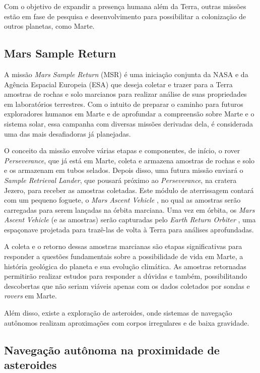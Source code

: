 Com o objetivo de expandir a presença humana além da Terra, outras missões estão em fase de pesquisa e desenvolvimento para possibilitar a colonização de outros planetas, como Marte.

\subsection{Mars Sample Return}

A missão \textit{Mars Sample Return} (MSR) \citep{nasa_mars_sample_return_2025} é uma iniciação conjunta da NASA e da Agência Espacial Europeia (ESA) que deseja coletar e trazer para a Terra amostras de rochas e solo marcianos para realizar análise de suas propriedades em laboratórios terrestres. Com o intuito de preparar o caminho para futuros exploradores humanos em Marte e de aprofundar a compreensão sobre Marte e o sistema solar, essa campanha com diversas missões derivadas dela, é considerada uma das mais desafiadoras já planejadas.

O conceito da missão envolve várias etapas e componentes, de início, o rover \textit{Perseverance}, que já está em Marte, coleta e armazena amostras de rochas e solo e os armazenam em tubos selados. Depois disso, uma futura missão enviará o \textit{Sample Retrieval Lander}, que pousará próximo ao \textit{Perseverance}, na cratera Jezero, para receber as amostras coletadas. Este módulo de aterrissagem contará com um pequeno foguete, o \textit{Mars Ascent Vehicle} \citep{nasa_mars_ascent_vehicle_2025}, no qual as amostras serão carregadas para serem lançadas na órbita marciana. Uma vez em órbita, os \textit{Mars Ascent Vehicle} (e as amostras) serão capturadas pelo \textit{Earth Return Orbiter} \citep{nasa_earth_return_orbiter_2025}, uma espaçonave projetada para trazê-las de volta à Terra para análises aprofundadas.

A coleta e o retorno dessas amostras marcianas são etapas significativas para responder a questões fundamentais sobre a possibilidade de vida em Marte, a história geológica do planeta e sua evolução climática. As amostras retornadas permitirão realizar estudos para responder a dúvidas e também, possibilitando descobertas que não seriam viáveis apenas com os dados coletados por sondas e \textit{rovers} em Marte.

Além disso, existe a exploração de asteroides, onde sistemas de navegação autônomos realizam aproximações com corpos irregulares e de baixa gravidade.

\subsection{Navegação autônoma na proximidade de asteroides}

